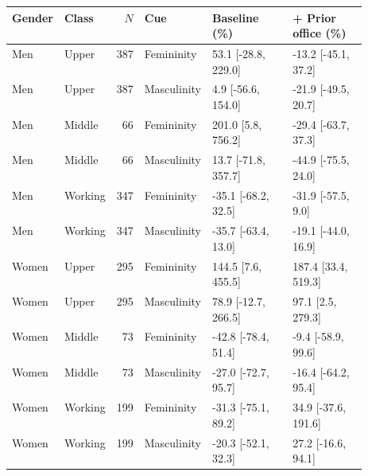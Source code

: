 \begin{tabular}{llrlp{0.26\linewidth}p{0.26\linewidth}}
\toprule
Gender & Class & $N$ & Cue & Baseline (\%) & + Prior office (\%) \\
\midrule
Men & Upper & 387 & Femininity & 53.1 [-28.8, 229.0] & -13.2 [-45.1, 37.2] \\
Men & Upper & 387 & Masculinity & 4.9 [-56.6, 154.0] & -21.9 [-49.5, 20.7] \\
Men & Middle & 66 & Femininity & 201.0 [5.8, 756.2] & -29.4 [-63.7, 37.3] \\
Men & Middle & 66 & Masculinity & 13.7 [-71.8, 357.7] & -44.9 [-75.5, 24.0] \\
Men & Working & 347 & Femininity & -35.1 [-68.2, 32.5] & -31.9 [-57.5, 9.0] \\
Men & Working & 347 & Masculinity & -35.7 [-63.4, 13.0] & -19.1 [-44.0, 16.9] \\
Women & Upper & 295 & Femininity & 144.5 [7.6, 455.5] & 187.4 [33.4, 519.3] \\
Women & Upper & 295 & Masculinity & 78.9 [-12.7, 266.5] & 97.1 [2.5, 279.3] \\
Women & Middle & 73 & Femininity & -42.8 [-78.4, 51.4] & -9.4 [-58.9, 99.6] \\
Women & Middle & 73 & Masculinity & -27.0 [-72.7, 95.7] & -16.4 [-64.2, 95.4] \\
Women & Working & 199 & Femininity & -31.3 [-75.1, 89.2] & 34.9 [-37.6, 191.6] \\
Women & Working & 199 & Masculinity & -20.3 [-52.1, 32.3] & 27.2 [-16.6, 94.1] \\
\bottomrule
\end{tabular}
